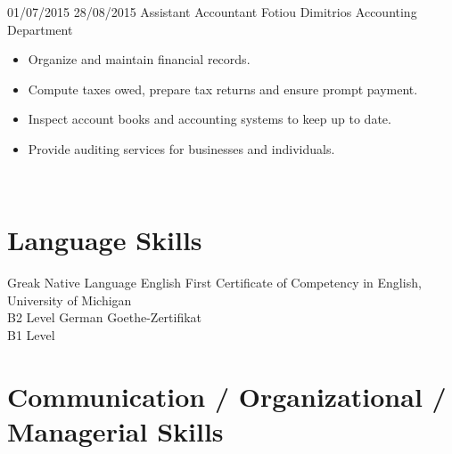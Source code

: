\documentclass[letterpaper]{engineer_cv} %
\begin{document}
	\begin{longList} %
		\longListItem
			{01/07/2015}
			{28/08/2015}
			{Assistant Accountant}
			{Fotiou Dimitrios Accounting Department}
			{}
			{\begin{itemize}
				\item Organize and maintain financial records.
				\item Compute taxes owed, prepare tax returns and ensure prompt payment.
                \item Inspect account books and accounting systems to keep up to date.
                \item Provide auditing services for businesses and individuals.
			\end{itemize}}
			\\
        \end{longList}


	\section{Language Skills}

	\begin{longList} %
		\longListItem
			{Greak}
			{}
			{Native Language}
			{}
			{}
			{}
		\longListItem
			{English}
			{}
			{First Certificate of Competency in English, University of Michigan}
			{\\B2 Level}
			{}
			{}
		\longListItem
			{German}
			{}
			{Goethe-Zertifikat}
			{\\B1 Level}
			{}
			{}
	\end{longList}


        \clearpage

	\infographics


	\section{Communication / Organizational / Managerial Skills}
\end{document}
